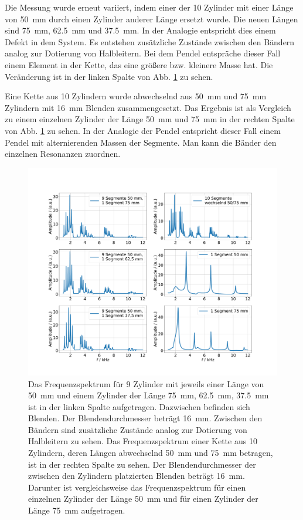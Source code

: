 Die Messung wurde erneut variiert, indem einer der \num{10} Zylinder mit einer Länge von \SI{50}{\milli\meter} durch einen Zylinder anderer Länge ersetzt wurde. Die neuen Längen sind \SI{75}{\milli\meter}, \SI{62.5}{\milli\meter} und \SI{37.5}{\milli\meter}. In der Analogie entspricht dies einem Defekt in dem System.
Es entstehen zusätzliche Zustände zwischen den Bändern analog zur Dotierung von Halbleitern.
Bei dem Pendel entspräche dieser Fall einem Element in der Kette, das eine größere bzw. kleinere Masse hat. 
Die Veränderung ist in der linken Spalte von Abb. \ref{fig:var4} zu sehen.

Eine Kette aus 10 Zylindern wurde abwechselnd aus \SI{50}{\milli\meter} und \SI{75}{\milli\meter} Zylindern mit \SI{16}{\milli\meter} Blenden zusammengesetzt.
Das Ergebnis ist als Vergleich zu einem einzelnen Zylinder der Länge \SI{50}{\milli\metre} und \SI{75}{\milli\metre} in der rechten Spalte von Abb. \ref{fig:var4} zu sehen. In der Analogie der Pendel entspricht dieser Fall einem Pendel mit alternierenden Massen der Segmente.
Man kann die Bänder den einzelnen Resonanzen zuordnen. %
 
\begin{figure}
    \centering
    \includegraphics[width=\textwidth]{plots/B_5.pdf}
    \caption{Das Frequenzspektrum für 9 Zylinder mit jeweils einer Länge von \SI{50}{\milli\metre} und einem Zylinder der Länge \SI{75}{\milli\metre}, \SI{62.5}{\milli\metre}, \SI{37.5}{\milli\metre} ist in der linken Spalte aufgetragen. Dazwischen befinden sich Blenden. Der Blendendurchmesser beträgt \SI{16}{\milli\metre}. Zwischen den Bändern sind zusätzliche Zustände analog zur Dotierung von Halbleitern zu sehen. %
    Das Frequenzspektrum einer Kette aus 10 Zylindern, deren Längen abwechselnd \SI{50}{\milli\metre} und \SI{75}{\milli\metre} betragen, ist in der rechten Spalte zu sehen. Der Blendendurchmesser der zwischen den Zylindern platzierten Blenden beträgt \SI{16}{\milli\metre}. Darunter ist vergleichsweise das Frequenzspektrum für einen einzelnen Zylinder der Länge \SI{50}{\milli\metre} und für einen Zylinder der Länge \SI{75}{\milli\metre} aufgetragen.}
    \label{fig:var4}
\end{figure}

